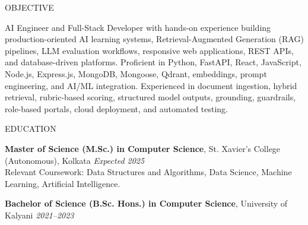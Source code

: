 \documentclass{resume}
\begin{document}

\begin{rSection}{OBJECTIVE}

AI Engineer and Full-Stack Developer with hands-on experience building production-oriented AI learning systems, Retrieval-Augmented Generation (RAG) pipelines, LLM evaluation workflows, responsive web applications, REST APIs, and database-driven platforms. Proficient in Python, FastAPI, React, JavaScript, Node.js, Express.js, MongoDB, Mongoose, Qdrant, embeddings, prompt engineering, and AI/ML integration. Experienced in document ingestion, hybrid retrieval, rubric-based scoring, structured model outputs, grounding, guardrails, role-based portals, cloud deployment, and automated testing.

\end{rSection}


\begin{rSection}{EDUCATION}

\textbf{Master of Science (M.Sc.) in Computer Science}, St. Xavier's College (Autonomous), Kolkata \hfill \textit{Expected 2025}\\
Relevant Coursework: Data Structures and Algorithms, Data Science, Machine Learning, Artificial Intelligence.

\textbf{Bachelor of Science (B.Sc. Hons.) in Computer Science}, University of Kalyani \hfill \textit{2021--2023}

\end{rSection}

\end{document}
